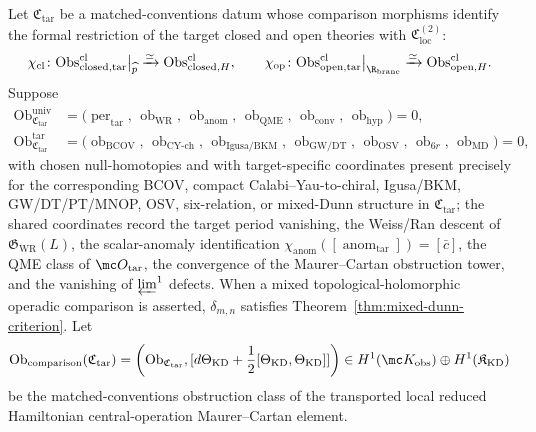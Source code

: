 \begin{thm}\label{thm:matched-conventions-transfer}
  Let \(\mathfrak C_{\mathrm{tar}}\) be a matched-conventions datum
  whose comparison morphisms identify the formal restriction of the
  target closed and open theories with
  \(\mathfrak C_{\mathrm{loc}}^{(2)}\):
  \[
    \chi_{\mathrm{cl}}\colon
    \mathrm{Obs}^{\mathrm{cl}}_{\mathrm{closed},\mathrm{tar}}\big|_{\widehat p}
      \xrightarrow{\simeq}
    \mathrm{Obs}^{\mathrm{cl}}_{\mathrm{closed},H},
    \qquad
    \chi_{\mathrm{op}}\colon
    \mathrm{Obs}^{\mathrm{cl}}_{\mathrm{open},\mathrm{tar}}\big|_{\R_{\mathrm{brane}}}
      \xrightarrow{\simeq}
    \mathrm{Obs}^{\mathrm{cl}}_{\mathrm{open},H}.
  \]
  Suppose
  \begin{align*}
    \operatorname{Ob}_{\mathfrak C_{\mathrm{tar}}}^{\mathrm{univ}}
      &=\bigl(
        \operatorname{per}_{\mathrm{tar}},\,
        \operatorname{ob}_{\mathrm{WR}},\,
        \operatorname{ob}_{\mathrm{anom}},\,
        \operatorname{ob}_{\mathrm{QME}},\,
        \operatorname{ob}_{\mathrm{conv}},\,
        \operatorname{ob}_{\mathrm{hyp}}
      \bigr)=0,\\
    \operatorname{Ob}_{\mathfrak C_{\mathrm{tar}}}^{\mathrm{tar}}
      &=\bigl(
        \operatorname{ob}_{\mathrm{BCOV}},\,
        \operatorname{ob}_{\mathrm{CY\mbox{-}ch}},\,
        \operatorname{ob}_{\mathrm{Igusa/BKM}},\,
        \operatorname{ob}_{\mathrm{GW/DT}},\,
        \operatorname{ob}_{\mathrm{OSV}},\,
        \operatorname{ob}_{6r},\,
        \operatorname{ob}_{\mathrm{MD}}
      \bigr)=0,
  \end{align*}
  with chosen null-homotopies and with target-specific coordinates
  present precisely for the corresponding BCOV, compact Calabi--Yau-to-chiral,
  Igusa/BKM, GW/DT/PT/MNOP, OSV, six-relation, or mixed-Dunn structure in
  \(\mathfrak C_{\mathrm{tar}}\); the shared coordinates record the
  target period vanishing, the Weiss/Ran descent of
  \(\mathfrak G_{\mathrm{WR}}(L)\), the scalar-anomaly identification
  \(\chi_{\mathrm{anom}}([\operatorname{anom}_{\mathrm{tar}}])=[\bar c]\),
  the QME class of \(\mc O_{\mathrm{tar}}\), the convergence of the
  Maurer--Cartan obstruction tower, and the vanishing of
  \(\varprojlim^1\) defects.  When a mixed topological-holomorphic
  operadic comparison is asserted,
  \(\delta_{m,n}\) satisfies Theorem~\ref{thm:mixed-dunn-criterion}.
  Let
  \[
    \operatorname{Ob}_{\mathrm{comparison}}(\mathfrak C_{\mathrm{tar}})
      =
    \left(
      \operatorname{Ob}_{\mathfrak C_{\mathrm{tar}}},
      [d\Theta_{\mathrm{KD}}+\frac12[\Theta_{\mathrm{KD}},\Theta_{\mathrm{KD}}]]
    \right)
    \in
    H^1(\mc K_{\mathrm{obs}})
      \oplus H^1(\mathfrak K_{\mathrm{KD}})
  \]
  be the matched-conventions obstruction class of the transported local reduced
  Hamiltonian central-operation Maurer--Cartan element.


\end{thm}
